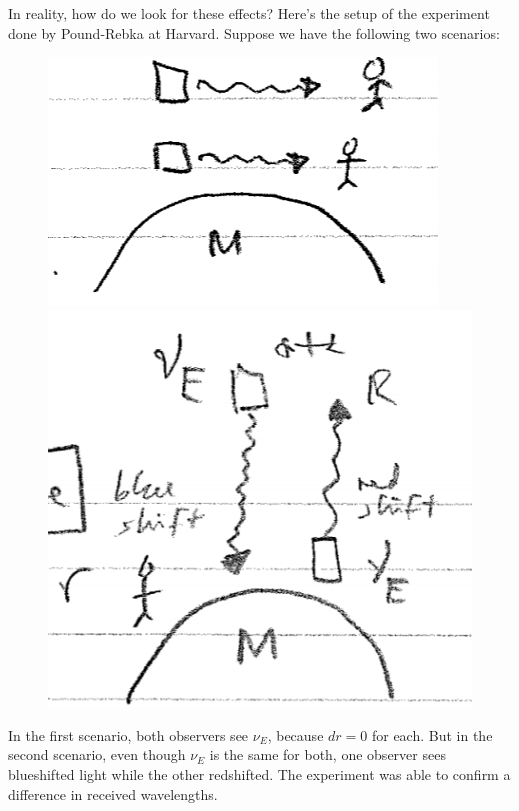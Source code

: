 \documentclass{book}
\theoremstyle{definition}
\begin{document}
In reality, how do we look for these effects? Here's the setup of the experiment done by Pound-Rebka at Harvard. Suppose we have the following two scenarios:
\begin{figure}[!htb]
	\centering
	\includegraphics[scale=0.3]{scene1}
	\includegraphics[scale=0.3]{scene2}
\end{figure}
In the first scenario, both observers see $\nu_E$, because $dr = 0$ for each. But in the second scenario, even though $\nu_E$ is the same for both, one observer sees blueshifted light while the other redshifted. The experiment was able to confirm a difference in received wavelengths.
\end{document}
